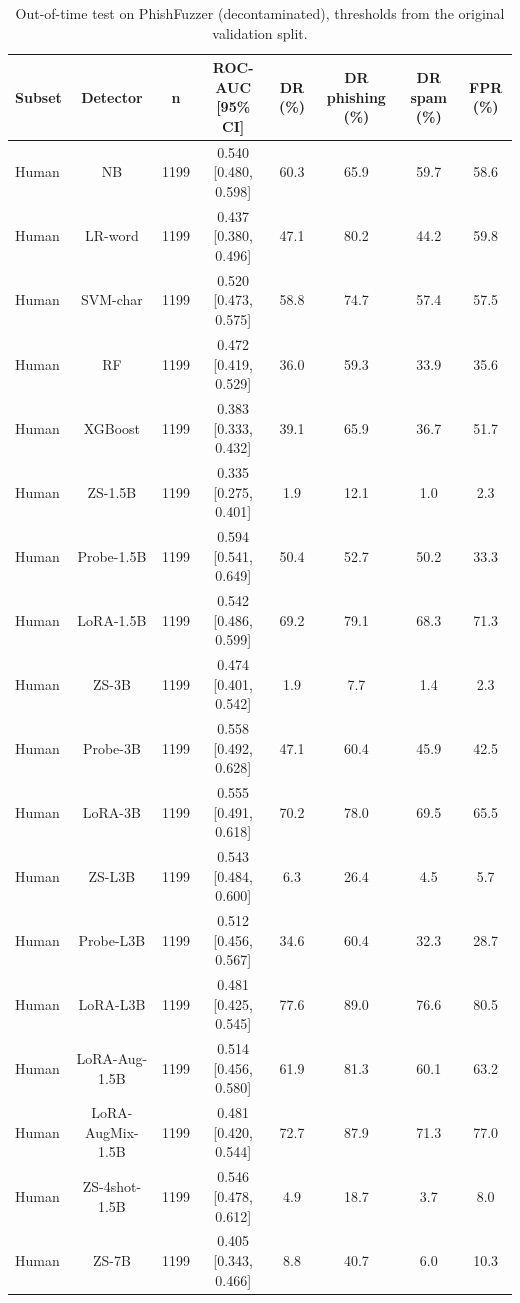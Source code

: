 \begin{table}[t]
\centering
\caption{Out-of-time test on PhishFuzzer (decontaminated), thresholds from the original validation split.}
\label{tab:modern}
\footnotesize
\begin{tabular}{lccccccc}
\toprule
\textbf{Subset} & \textbf{Detector} & \textbf{n} & \textbf{ROC-AUC [95\% CI]} & \textbf{DR (\%)} & \textbf{DR phishing (\%)} & \textbf{DR spam (\%)} & \textbf{FPR (\%)} \\
\midrule
Human & NB & 1199 & 0.540 [0.480, 0.598] & 60.3 & 65.9 & 59.7 & 58.6 \\
Human & LR-word & 1199 & 0.437 [0.380, 0.496] & 47.1 & 80.2 & 44.2 & 59.8 \\
Human & SVM-char & 1199 & 0.520 [0.473, 0.575] & 58.8 & 74.7 & 57.4 & 57.5 \\
Human & RF & 1199 & 0.472 [0.419, 0.529] & 36.0 & 59.3 & 33.9 & 35.6 \\
Human & XGBoost & 1199 & 0.383 [0.333, 0.432] & 39.1 & 65.9 & 36.7 & 51.7 \\
Human & ZS-1.5B & 1199 & 0.335 [0.275, 0.401] & 1.9 & 12.1 & 1.0 & 2.3 \\
Human & Probe-1.5B & 1199 & 0.594 [0.541, 0.649] & 50.4 & 52.7 & 50.2 & 33.3 \\
Human & LoRA-1.5B & 1199 & 0.542 [0.486, 0.599] & 69.2 & 79.1 & 68.3 & 71.3 \\
Human & ZS-3B & 1199 & 0.474 [0.401, 0.542] & 1.9 & 7.7 & 1.4 & 2.3 \\
Human & Probe-3B & 1199 & 0.558 [0.492, 0.628] & 47.1 & 60.4 & 45.9 & 42.5 \\
Human & LoRA-3B & 1199 & 0.555 [0.491, 0.618] & 70.2 & 78.0 & 69.5 & 65.5 \\
Human & ZS-L3B & 1199 & 0.543 [0.484, 0.600] & 6.3 & 26.4 & 4.5 & 5.7 \\
Human & Probe-L3B & 1199 & 0.512 [0.456, 0.567] & 34.6 & 60.4 & 32.3 & 28.7 \\
Human & LoRA-L3B & 1199 & 0.481 [0.425, 0.545] & 77.6 & 89.0 & 76.6 & 80.5 \\
Human & LoRA-Aug-1.5B & 1199 & 0.514 [0.456, 0.580] & 61.9 & 81.3 & 60.1 & 63.2 \\
Human & LoRA-AugMix-1.5B & 1199 & 0.481 [0.420, 0.544] & 72.7 & 87.9 & 71.3 & 77.0 \\
Human & ZS-4shot-1.5B & 1199 & 0.546 [0.478, 0.612] & 4.9 & 18.7 & 3.7 & 8.0 \\
Human & ZS-7B & 1199 & 0.405 [0.343, 0.466] & 8.8 & 40.7 & 6.0 & 10.3 \\

\end{tabular}
\end{table}
